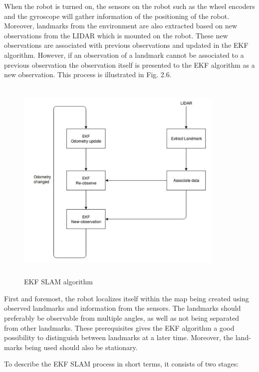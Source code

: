 When the robot is turned on, the sensors on the robot such as the wheel encoders and the gyroscope will gather information of the positioning of the robot. Moreover, landmarks from the environment are also extracted based on new observations from the LIDAR which is mounted on the robot. These new observations are associated with previous observations and updated in the EKF algorithm. However, if an observation of a landmark cannot be associated to a previous observation the observation itself is presented to the EKF algorithm as a new observation.\cite{mit2017} This process is illustrated in Fig. 2.6.

\begin{figure}[!htbp]
\centering
\includegraphics[width=10cm,height=10cm,angle=0]{thesisChapters/images/figure26.png}
\caption{EKF SLAM algorithm \cite{yifan2016}}
\end{figure}

First and foremost, the robot localizes itself within the map being created using observed landmarks and information from the sensors. The landmarks should preferably be observable from multiple angles, as well as not being separated from other landmarks. These prerequisites gives the EKF algorithm a good possibility to distinguish between landmarks at a later time. Moreover, the land- marks being used should also be stationary. \cite{yifan2016}


To describe the EKF SLAM process in short terms, it consists of two stages:

